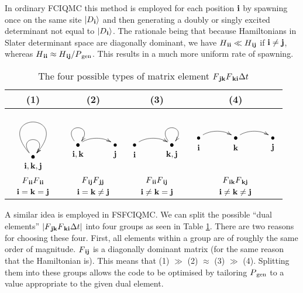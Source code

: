 \documentclass{article}
\newcommand{\ket}[1]{|#1\rangle}
\newcommand{\D}[1]{D\/_{\bf #1 } }
\newcommand{\fij}[2]{F\/_{\bf #1 #2} }
\newcommand{\Rji}{\fij{j}{k} \fij{k}{i} \Delta t}
\begin{document}
In ordinary FCIQMC this method is employed for each position $\bf i$ by spawning once on the same site $\ket{\D{i}}$ and then generating a doubly or singly excited determinant not equal to $\ket{\D{i}}$. The rationale being that because Hamiltonians in Slater determinant space are diagonally dominant, we have $H\/_{\bf i i} \ll H\/_{\bf i j}$ if ${\bf i} \ne {\bf j} $, whereas $H\/_{\bf i i} \approx {H\/_{\bf i j}}/{P\/_{\text{gen}}}$. This results in a much more uniform rate of spawning.

\begin{table}
\caption{The four possible types of matrix element $\Rji$}
\centering
\label{4types}

\begin{tabular}[c]{|c|c|c|c|}
\hline
(1) & (2) & (3) & (4) \\
\hline
{$
\xy
(0,0)*+{\bullet};(0,0)*+{\bullet}
**\crv{(-20,20)&(20,20)}
?>*\dir{>};
(0,0)*+{\bullet};(0,0)*+{\bullet}
**\crv{(-10,10)&(10,10)}
?>*\dir{>};
(0,-4)*+{\bf i,k,j}
\endxy
$}
&
{$
\xy 
(0,0)*+{\bullet};(0,0)*+{\bullet}
**\crv{(-10,10)&(10,10)}
?>*\dir{>};
(0,0)*+{\bullet};(16,0)*+{\bullet}
**\crv{(4,4)&(12,4)}
?>*\dir{>};
(0,-4)*+{\bf i,k}; (16,-4)*+{\bf j}
\endxy
$}
&
{$
\xy 
(0,0)*+{\bullet};(16,0)*+{\bullet}
**\crv{(4,4)&(12,4)}
?>*\dir{>};
(16,0)*+{\bullet};(16,0)*+{\bullet}
**\crv{(6,10)&(26,10)}
?>*\dir{>};
(0,-4)*+{\bf i}; (16,-4)*+{\bf k,j}
\endxy
$}
&
{$
\xy 
(0,0)*+{\bullet};(16,0)*+{\bullet}
**\crv{(4,4)&(12,4)}
?>*\dir{>};
(16,0) *+{\bullet};(32,0)*+{\bullet}
**\crv{(20,4)&(28,4)}
?>*\dir{>};
(0,-4)*+{\bf i}; (16,-4)*+{\bf k}; (32,-4)*+{\bf j}
\endxy
$}
\\
\hline
$\fij{i}{i}\fij{i}{i}$ &
$\fij{i}{j}\fij{j}{j}$ & 
$\fij{i}{i}\fij{i}{j}$ &
$\fij{i}{k}\fij{k}{j}$ 
\\
${\bf i} = {\bf k} = {\bf j} $ &
${\bf i} = {\bf k} \ne {\bf j} $ &
${\bf i} \ne {\bf k} = {\bf j} $ & 
${\bf i} \ne {\bf k} \ne {\bf j} $ 
\\
\hline
\end{tabular}
\end{table}
A similar idea is employed in FSFCIQMC. We can split the possible ``dual elements'' $|\Rji|$ into four groups as seen in Table \ref{4types}. There are two reasons for choosing these four. First, all elements within a group are of roughly the same order of magnitude. $\fij{i}{j}$ is a diagonally dominant matrix (for the same reason that the Hamiltonian is). This means that (1) $\gg$ (2) $\approx$ (3) $\gg$ (4). Splitting them into these groups allows the code to be optimised by tailoring $P\/_{\text{gen}}$ to a value appropriate to the given dual element.
\end{document}
